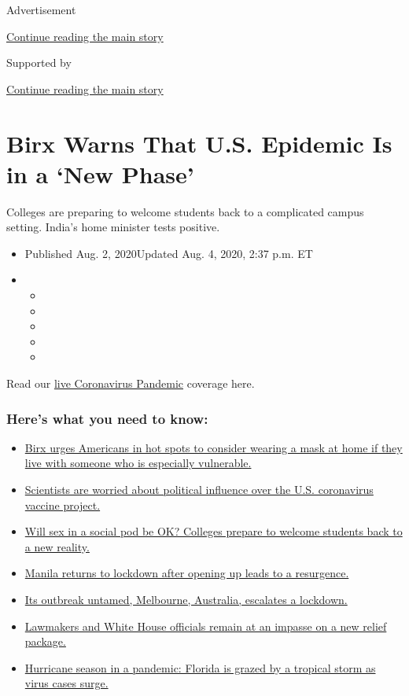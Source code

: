 Advertisement

\protect\hyperlink{after-top}{Continue reading the main story}

Supported by

\protect\hyperlink{after-sponsor}{Continue reading the main story}

\hypertarget{birx-warns-that-us-epidemic-is-in-a-new-phase}{%
\section{Birx Warns That U.S. Epidemic Is in a `New
Phase'}\label{birx-warns-that-us-epidemic-is-in-a-new-phase}}

Colleges are preparing to welcome students back to a complicated campus
setting. India's home minister tests positive.

\begin{itemize}
\item
  Published Aug. 2, 2020Updated Aug. 4, 2020, 2:37 p.m. ET
\item
  \begin{itemize}
  \item
  \item
  \item
  \item
  \item
  \end{itemize}
\end{itemize}

Read our
\href{https://www.nytimes3xbfgragh.onion/2020/08/04/world/coronavirus-cases.html}{live
Coronavirus Pandemic} coverage here.

\hypertarget{heres-what-you-need-to-know}{%
\subsubsection{Here's what you need to
know:}\label{heres-what-you-need-to-know}}

\begin{itemize}
\tightlist
\item
  \protect\hyperlink{link-4c637647}{Birx urges Americans in hot spots to
  consider wearing a mask at home if they live with someone who is
  especially vulnerable.}
\item
  \protect\hyperlink{link-18bff79b}{Scientists are worried about
  political influence over the U.S. coronavirus vaccine project.}
\item
  \protect\hyperlink{link-79292e3}{Will sex in a social pod be OK?
  Colleges prepare to welcome students back to a new reality.}
\item
  \protect\hyperlink{link-41ce99eb}{Manila returns to lockdown after
  opening up leads to a resurgence.}
\item
  \protect\hyperlink{link-74f9a2b2}{Its outbreak untamed, Melbourne,
  Australia, escalates a lockdown.}
\item
  \protect\hyperlink{link-1a62dbb2}{Lawmakers and White House officials
  remain at an impasse on a new relief package.}
\item
  \protect\hyperlink{link-479653b6}{Hurricane season in a pandemic:
  Florida is grazed by a tropical storm as virus cases surge.}
\end{itemize}

